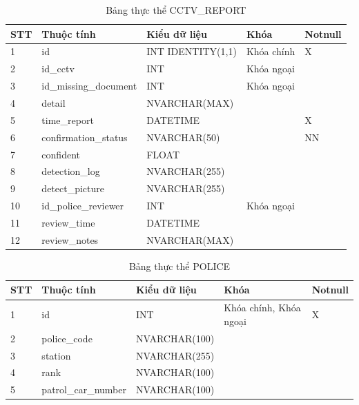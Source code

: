 \documentclass[../DoAn.tex]{subfiles}
\begin{document}
\begin{table}[H]
	\centering{}
	\begin{tabular}{m{1cm} m{4cm} m{3.5cm} m{3cm} m{1.5cm}}
		\hline
		\textbf{STT} & \textbf{Thuộc tính}   & \textbf{Kiểu dữ liệu} & \textbf{Khóa} & \textbf{Notnull}
		\\ \hline
		1            & id                    & INT IDENTITY(1,1)     & Khóa chính    & X
		\\ \hline
		2            & id\_cctv              & INT                   & Khóa ngoại    &
		\\ \hline
		3            & id\_missing\_document & INT                   & Khóa ngoại    &
		\\ \hline
		4            & detail                & NVARCHAR(MAX)         &               &
		\\ \hline
		5            & time\_report          & DATETIME              &               & X
		\\ \hline
		6            & confirmation\_status  & NVARCHAR(50)          &               & NN
		\\ \hline
		7            & confident             & FLOAT                 &               &
		\\ \hline
		8            & detection\_log        & NVARCHAR(255)         &               &
		\\ \hline
		9            & detect\_picture       & NVARCHAR(255)         &               &
		\\ \hline
		10           & id\_police\_reviewer  & INT                   & Khóa ngoại    &
		\\ \hline
		11           & review\_time          & DATETIME              &               &
		\\ \hline
		12           & review\_notes         & NVARCHAR(MAX)         &               &
		\\ \hline
	\end{tabular}
	\caption{Bảng thực thể CCTV\_REPORT}
\end{table}

\begin{table}[H]
	\centering{}
	\begin{tabular}{m{1cm} m{4cm} m{3.5cm} m{3cm} m{1.5cm}}
		\hline
		\textbf{STT} & \textbf{Thuộc tính} & \textbf{Kiểu dữ liệu} & \textbf{Khóa}          & \textbf{Notnull}
		\\ \hline
		1            & id                  & INT                   & Khóa chính, Khóa ngoại & X
		\\ \hline
		2            & police\_code        & NVARCHAR(100)         &                        &
		\\ \hline
		3            & station             & NVARCHAR(255)         &                        &
		\\ \hline
		4            & rank                & NVARCHAR(100)         &                        &
		\\ \hline
		5            & patrol\_car\_number & NVARCHAR(100)         &                        &
		\\ \hline
	\end{tabular}
	\caption{Bảng thực thể POLICE}
\end{table}
\end{document}
